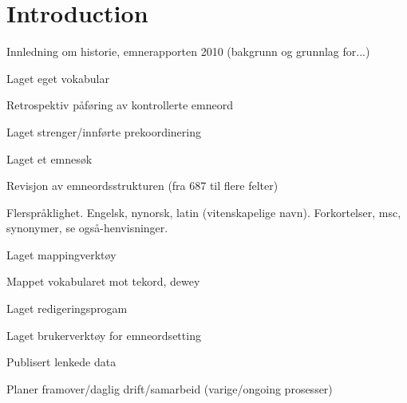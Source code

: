 \section{Introduction}

Innledning om historie, emnerapporten 2010 (bakgrunn og grunnlag for...)

Laget eget vokabular

Retrospektiv påføring av kontrollerte emneord

Laget strenger/innførte prekoordinering

Laget et emnesøk 

Revisjon av emneordsstrukturen (fra 687 til flere felter)

Flerspråklighet. Engelsk, nynorsk, latin (vitenskapelige navn). Forkortelser, msc, 
synonymer, se også-henvisninger. 

Laget mappingverktøy

Mappet vokabularet mot tekord, dewey

Laget redigeringsprogam 

Laget brukerverktøy for emneordsetting

Publisert lenkede data

Planer framover/daglig drift/samarbeid (varige/ongoing prosesser)
